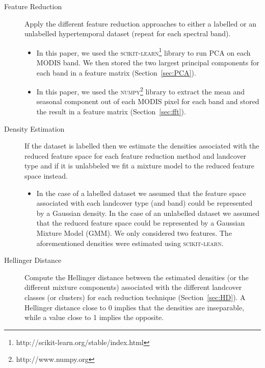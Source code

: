 \documentclass{article}
\begin{document}
\begin{description}
 \item[Feature Reduction] Apply the different feature reduction approaches to either a labelled or an unlabelled hypertemporal dataset (repeat for each spectral band). 
 \begin{itemize}
  \item In this paper, we used the \textsc{scikit-learn}\footnote{http://scikit-learn.org/stable/index.html} library to run PCA on each MODIS band. We then stored the two largest principal components for each band in a feature matrix (Section~\ref{sec:PCA}). 
  \item In this paper, we used the \textsc{numpy}\footnote{http://www.numpy.org} library to extract the mean and seasonal component out of each MODIS pixel for each band and stored the result in a feature matrix (Section~\ref{sec:fft}). 
 \end{itemize}
 \item[Density Estimation] If the dataset is labelled then we estimate the densities associated with the reduced feature space for each feature reduction method and landcover type and if 
 it is unlabbeled we fit a mixture model to the reduced feature space instead.
 \begin{itemize}
  \item In the case of a labelled dataset 
  we assumed that the feature space associated with each landcover type (and band) could be represented by a Gaussian density. In the case 
  of an unlabelled dataset we assumed that the reduced feature space could be represented by a Gaussian Mixture Model (GMM). We only considered two features. The aforementioned densities were estimated 
  using \textsc{scikit-learn}.
 \end{itemize}
 \item[Hellinger Distance] Compute the Hellinger distance between the estimated densities (or the different mixture components) associated with the different landcover classes (or clusters) for each reduction technique (Section~\ref{sec:HD}).
 A Hellinger distance close to 0 implies that the densities are inseparable, while a value close to 1 implies the opposite.
\end{description}
\end{document}
